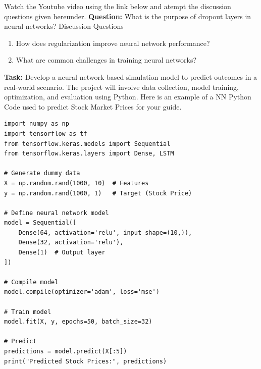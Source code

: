\documentclass[12pt,a4paper]{article}
\begin{document}
Watch the Youtube video using the link below and atempt the discussion questions given hereunder.
\textbf{Question:} What is the purpose of dropout layers in neural networks?
Discussion Questions
\begin{enumerate}
 \item How does regularization improve neural network performance?
 \item What are common challenges in training neural networks?
\end{enumerate}

\textbf{Task:} Develop a neural network-based simulation model to predict outcomes in a real-world scenario. The project will involve data collection, model training, optimization, and evaluation using Python.
Here is an example of a NN Python Code used to predict Stock Market Prices for your guide.
\begin{verbatim}
import numpy as np
import tensorflow as tf
from tensorflow.keras.models import Sequential
from tensorflow.keras.layers import Dense, LSTM

# Generate dummy data
X = np.random.rand(1000, 10)  # Features
y = np.random.rand(1000, 1)   # Target (Stock Price)

# Define neural network model
model = Sequential([
    Dense(64, activation='relu', input_shape=(10,)),
    Dense(32, activation='relu'),
    Dense(1)  # Output layer
])

# Compile model
model.compile(optimizer='adam', loss='mse')

# Train model
model.fit(X, y, epochs=50, batch_size=32)

# Predict
predictions = model.predict(X[:5])
print("Predicted Stock Prices:", predictions)
\end{verbatim}

\end{document}
